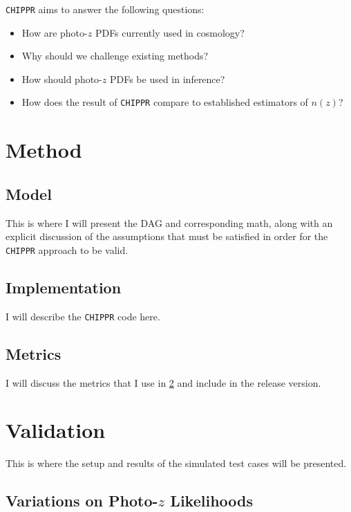 \documentclass[preprint]{aastex}
\newcommand{\chippr}{\texttt{CHIPPR} }
\begin{document}
\chippr aims to answer the following questions:

\begin{itemize}
	\item How are photo-$z$ PDFs currently used in cosmology?
	\item Why should we challenge existing methods?
	\item How should photo-$z$ PDFs be used in inference?
	\item How does the result of \chippr compare to established estimators 
of $n(z)$?
\end{itemize}

\section{Method}
\label{sec:method}



\subsection{Model}
\label{sec:model}

This is where I will present the DAG and corresponding math, along with an 
explicit discussion of the assumptions that must be satisfied in order for the 
\chippr approach to be valid.

\subsection{Implementation}
\label{sec:implementation}

I will describe the \chippr code here.

\subsection{Metrics}
\label{sec:metrics}

I will discuss the metrics that I use in \ref{sec:validation} and include in 
the release version.

\section{Validation}
\label{sec:validation}

This is where the setup and results of the simulated test cases will be 
presented.

\subsection{Variations on Photo-$z$ Likelihoods}
\label{sec:likelihoods}
\end{document}
